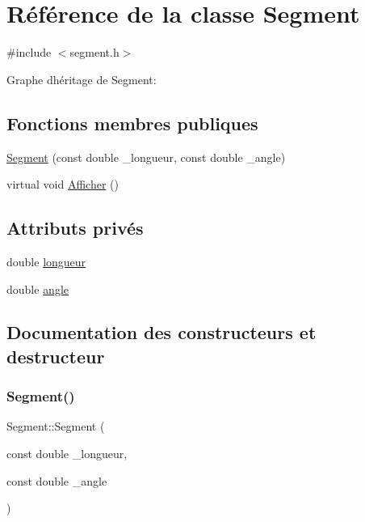 \hypertarget{class_segment}{}\section{Référence de la classe Segment}
\label{class_segment}


{\ttfamily \#include $<$segment.\+h$>$}



Graphe d\textquotesingle{}héritage de Segment\+:
\subsection*{Fonctions membres publiques}
\begin{DoxyCompactItemize}
\item 
\hyperlink{class_segment_ad3b498d0e23a006fc3e750bd76153a2a}{Segment} (const double \+\_\+longueur, const double \+\_\+angle)
\item 
virtual void \hyperlink{class_segment_a1ec3ffd47a383755b4f0a51311a5c7d7}{Afficher} ()
\end{DoxyCompactItemize}
\subsection*{Attributs privés}
\begin{DoxyCompactItemize}
\item 
double \hyperlink{class_segment_a89584eea5e0b7c9d3fe5bcddf437f358}{longueur}
\item 
double \hyperlink{class_segment_a58f4b5a7f3c0a1038d10e778f3684b20}{angle}
\end{DoxyCompactItemize}


\subsection{Documentation des constructeurs et destructeur}
\mbox{\label{class_segment_ad3b498d0e23a006fc3e750bd76153a2a}} 
\subsubsection{\texorpdfstring{Segment()}{Segment()}}
{\footnotesize\ttfamily Segment\+::\+Segment (\begin{DoxyParamCaption}\item[{const double}]{\+\_\+longueur,  }\item[{const double}]{\+\_\+angle }\end{DoxyParamCaption})}



